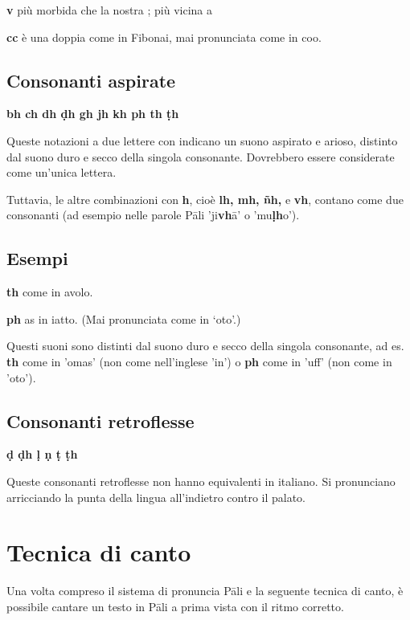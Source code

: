\textbf{v} più morbida che la nostra ; più vicina a 

\textbf{cc} è una doppia  come in Fibonai, mai pronunciata come in coo.

\subsection{Consonanti aspirate}

\textbf{bh ch dh ḍh gh jh kh ph th ṭh}

Queste notazioni a due lettere con  indicano un suono aspirato e arioso,
distinto dal suono duro e secco della singola consonante. Dovrebbero essere
considerate come un'unica lettera.


Tuttavia, le altre combinazioni con \textbf{h}, cioè \textbf{lh, mh, ñh,} e
\textbf{vh}, contano come due consonanti (ad esempio nelle parole Pāli
'ji\textbf{vh}ā' o 'mu\textbf{ḷh}o').

\ifaivedition
\clearpage
\fi

\subsection{Esempi}

\textbf{th} come  in avolo.

\textbf{ph} as  in iatto. (Mai pronunciata come in `oto'.)

Questi suoni sono distinti dal suono duro e secco della singola consonante, ad es.
\textbf{th} come in 'omas' (non come nell'inglese 'in') o \textbf{ph} come
in 'uff' (non come in 'oto').

\subsection{Consonanti retroflesse}

\textbf{ḍ ḍh ḷ ṇ ṭ ṭh}

Queste consonanti retroflesse non hanno equivalenti in italiano. Si pronunciano
arricciando la punta della lingua all'indietro contro il palato.

\section{Tecnica di canto}

Una volta compreso il sistema di pronuncia Pāli e la seguente
tecnica di canto, è possibile cantare un testo in Pāli a prima vista
con il ritmo corretto.

